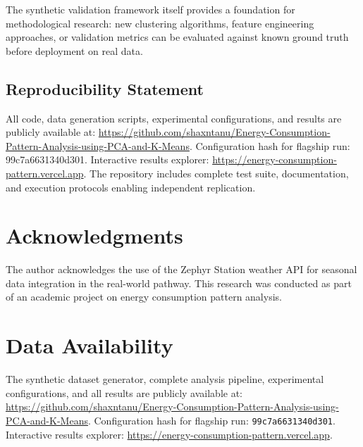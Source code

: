 \documentclass[11pt,a4paper]{article}
\begin{document}
The synthetic validation framework itself provides a foundation for methodological research: new clustering algorithms, feature engineering approaches, or validation metrics can be evaluated against known ground truth before deployment on real data.

\subsection{Reproducibility Statement}

All code, data generation scripts, experimental configurations, and results are publicly available at: \url{https://github.com/shaxntanu/Energy-Consumption-Pattern-Analysis-using-PCA-and-K-Means}. Configuration hash for flagship run: 99c7a6631340d301. Interactive results explorer: \url{https://energy-consumption-pattern.vercel.app}. The repository includes complete test suite, documentation, and execution protocols enabling independent replication.

\section*{Acknowledgments}
The author acknowledges the use of the Zephyr Station weather API for seasonal data integration in the real-world pathway. This research was conducted as part of an academic project on energy consumption pattern analysis.

\section*{Data Availability}
The synthetic dataset generator, complete analysis pipeline, experimental configurations, and all results are publicly available at: \url{https://github.com/shaxntanu/Energy-Consumption-Pattern-Analysis-using-PCA-and-K-Means}. Configuration hash for flagship run: \texttt{99c7a6631340d301}. Interactive results explorer: \url{https://energy-consumption-pattern.vercel.app}.

\end{document}

